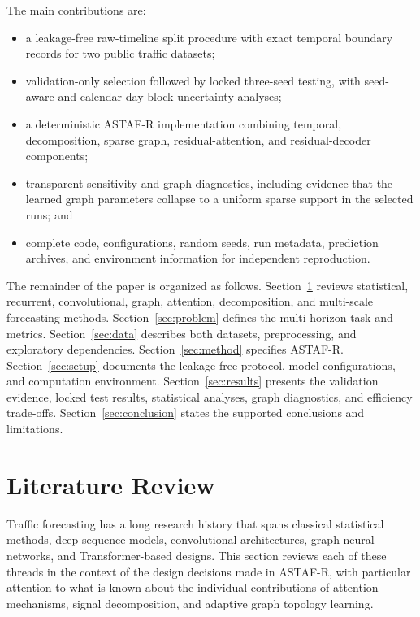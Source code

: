 \documentclass[fleqn,10pt]{wlscirep}
\begin{document}
The main contributions are:
\begin{itemize}
\item a leakage-free raw-timeline split procedure with exact temporal boundary
records for two public traffic datasets;
\item validation-only selection followed by locked three-seed testing, with
seed-aware and calendar-day-block uncertainty analyses;
\item a deterministic ASTAF-R implementation combining temporal, decomposition,
sparse graph, residual-attention, and residual-decoder components;
\item transparent sensitivity and graph diagnostics, including evidence that
the learned graph parameters collapse to a uniform sparse support in the
selected runs; and
\item complete code, configurations, random seeds, run metadata, prediction
archives, and environment information for independent reproduction.
\end{itemize}

The remainder of the paper is organized as follows. Section~\ref{sec:related}
reviews statistical, recurrent, convolutional, graph, attention, decomposition,
and multi-scale forecasting methods. Section~\ref{sec:problem} defines the
multi-horizon task and metrics. Section~\ref{sec:data} describes both datasets,
preprocessing, and exploratory dependencies. Section~\ref{sec:method} specifies
ASTAF-R. Section~\ref{sec:setup} documents the leakage-free protocol, model
configurations, and computation environment. Section~\ref{sec:results} presents
the validation evidence, locked test results, statistical analyses, graph
diagnostics, and efficiency trade-offs. Section~\ref{sec:conclusion} states the
supported conclusions and limitations.

\section{Literature Review}
\label{sec:related}

Traffic forecasting has a long research history that spans classical
statistical methods, deep sequence models, convolutional architectures,
graph neural networks, and Transformer-based designs. This section
reviews each of these threads in the context of the design decisions
made in ASTAF-R, with particular attention to what is known about
the individual contributions of attention mechanisms, signal
decomposition, and adaptive graph topology learning.
\end{document}
